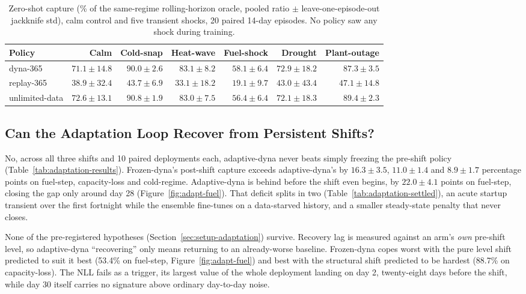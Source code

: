 \documentclass[conference]{IEEEtran}
\begin{document}
\begin{table}[t]
\centering
\caption{Zero-shot capture (\% of the same-regime rolling-horizon oracle, pooled ratio $\pm$ leave-one-episode-out jackknife std), calm control and five transient shocks, 20 paired 14-day episodes. No policy saw any shock during training.}
\label{tab:robustness-scenarios}
\begin{tabular}{lrrrrrr}
\toprule
Policy & Calm & Cold-snap & Heat-wave & Fuel-shock & Drought & Plant-outage \\
\midrule
dyna-365 & $71.1\pm14.8$ & $90.0\pm2.6$ & $83.1\pm8.2$ & $58.1\pm6.4$ & $72.9\pm18.2$ & $87.3\pm3.5$ \\
replay-365 & $38.9\pm32.4$ & $43.7\pm6.9$ & $33.1\pm18.2$ & $19.1\pm9.7$ & $43.0\pm43.4$ & $47.1\pm14.8$ \\
unlimited-data & $72.6\pm13.1$ & $90.8\pm1.9$ & $83.0\pm7.5$ & $56.4\pm6.4$ & $72.1\pm18.3$ & $89.4\pm2.3$ \\
\bottomrule
\end{tabular}
\end{table}

\subsection{Can the Adaptation Loop Recover from Persistent Shifts?}
\label{sec:results-adaptation}

No, across all three shifts and 10 paired deployments each, adaptive-dyna never beats simply freezing the pre-shift policy (Table~\ref{tab:adaptation-results}). Frozen-dyna's post-shift capture exceeds adaptive-dyna's by $16.3\pm3.5$, $11.0\pm1.4$ and $8.9\pm1.7$ percentage points on fuel-step, capacity-loss and cold-regime. Adaptive-dyna is behind before the shift even begins, by $22.0\pm4.1$ points on fuel-step, closing the gap only around day 28 (Figure~\ref{fig:adapt-fuel}). That deficit splits in two (Table~\ref{tab:adaptation-settled}), an acute startup transient over the first fortnight while the ensemble fine-tunes on a data-starved history, and a smaller steady-state penalty that never closes.

None of the pre-registered hypotheses (Section~\ref{sec:setup-adaptation}) survive. Recovery lag is measured against an arm's \emph{own} pre-shift level, so adaptive-dyna ``recovering'' only means returning to an already-worse baseline. Frozen-dyna copes worst with the pure level shift predicted to suit it best (53.4\% on fuel-step, Figure~\ref{fig:adapt-fuel}) and best with the structural shift predicted to be hardest (88.7\% on capacity-loss). The NLL fails as a trigger, its largest value of the whole deployment landing on day 2, twenty-eight days before the shift, while day 30 itself carries no signature above ordinary day-to-day noise.
\end{document}
